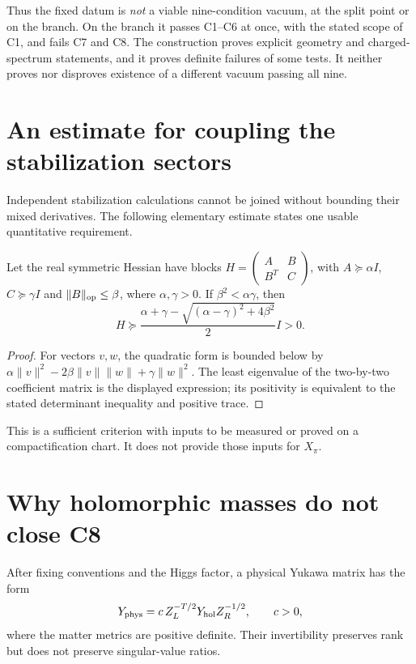 Thus the fixed datum is \emph{not} a viable nine-condition vacuum, at the
split point or on the branch. On the branch it passes C1--C6 at once, with
the stated scope of C1, and fails C7 and C8.
The construction proves explicit geometry and charged-spectrum statements,
and it proves definite failures of some tests. It neither proves nor
disproves existence of a different vacuum passing all nine.

\section{An estimate for coupling the stabilization sectors}\label{sec:blocks}
Independent stabilization calculations cannot be joined without bounding
their mixed derivatives. The following elementary estimate states one
usable quantitative requirement.
\begin{proposition}\label{prop:blockhessian}
Let the real symmetric Hessian have blocks
$H=\left(\begin{smallmatrix}A&B\\B^T&C\end{smallmatrix}\right)$,
with $A\succeq\alpha I$, $C\succeq\gamma I$ and
$\|B\|_{\rm op}\le\beta$, where $\alpha,\gamma>0$.
If $\beta^2<\alpha\gamma$, then
\[
 H\succeq\frac{\alpha+\gamma-
 \sqrt{(\alpha-\gamma)^2+4\beta^2}}2 I>0.
\]
\end{proposition}
\begin{proof}
For vectors $v,w$, the quadratic form is bounded below by
$\alpha\|v\|^2-2\beta\|v\|\|w\|+\gamma\|w\|^2$.
The least eigenvalue of the two-by-two coefficient matrix is the
displayed expression; its positivity is equivalent to the stated
determinant inequality and positive trace.
\end{proof}
This is a sufficient criterion with inputs to be measured or proved on
a compactification chart. It does not provide those inputs for $X_\pi$.


\section{Why holomorphic masses do not close C8}
After fixing conventions and the Higgs factor, a physical Yukawa matrix
has the form
\begin{equation}\label{eq:normalisation}
 Y_{\rm phys}=c\,Z_L^{-T/2}Y_{\rm hol}Z_R^{-1/2},
 \qquad c>0,
\end{equation}
where the matter metrics are positive definite. Their invertibility
preserves rank but does not preserve singular-value ratios.

